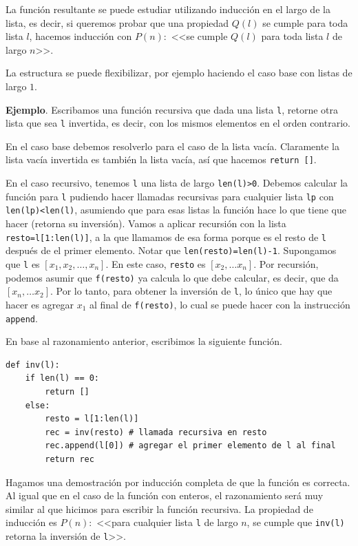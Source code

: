 \documentclass[a4paper, 12pt]{report}
\theoremstyle{definition}
\begin{document}
La función resultante se puede estudiar utilizando inducción en el largo de la lista, es decir, si queremos probar que una propiedad $Q(l)$ se cumple para toda lista $l$, hacemos inducción con $P(n):$ <<se cumple $Q(l)$ para toda lista $l$ de largo $n$>>.

La estructura se puede flexibilizar, por ejemplo haciendo el caso base con listas de largo $1$.

\vspace{0.5em}
{\bf Ejemplo}. Escribamos una función recursiva que dada una lista {\tt l}, retorne otra lista que sea {\tt l} invertida, es decir, con los mismos elementos en el orden contrario.

En el caso base debemos resolverlo para el caso de la lista vacía. Claramente la lista vacía invertida es también la lista vacía, así que hacemos {\tt return []}.

En el caso recursivo, tenemos {\tt l} una lista de largo {\tt len(l)>0}. Debemos calcular la función para {\tt l} pudiendo hacer llamadas recursivas para cualquier lista {\tt lp} con {\tt len(lp)<len(l)}, asumiendo que para esas listas la función hace lo que tiene que hacer (retorna su inversión). Vamos a aplicar recursión con la lista {\tt resto=l[1:len(l)]}, a la que llamamos de esa forma porque es el resto de {\tt l} después de el primer elemento. Notar que {\tt len(resto)=len(l)-1}. Supongamos que {\tt l} es $[x_1,x_2,\dots,x_n]$. En este caso, {\tt resto} es $[x_2,\dots x_n]$. Por recursión, podemos asumir que {\tt f(resto)} ya calcula lo que debe calcular, es decir, que da $[x_n,\dots x_2]$. Por lo tanto, para obtener la inversión de {\tt l}, lo único que hay que hacer es agregar $x_1$ al final de {\tt f(resto)}, lo cual se puede hacer con la instrucción {\tt append}.

En base al razonamiento anterior, escribimos la siguiente función.
\begin{verbatim}
def inv(l):
    if len(l) == 0:
        return []
    else:
        resto = l[1:len(l)]
        rec = inv(resto) # llamada recursiva en resto
        rec.append(l[0]) # agregar el primer elemento de l al final
        return rec
\end{verbatim}

Hagamos una demostración por inducción completa de que la función es correcta. Al igual que en el caso de la función con enteros, el razonamiento será muy similar al que hicimos para escribir la función recursiva. La propiedad de inducción es $P(n):$ <<para cualquier lista {\tt l} de largo $n$, se cumple que {\tt inv(l)} retorna la inversión de {\tt l}>>.
\end{document}
